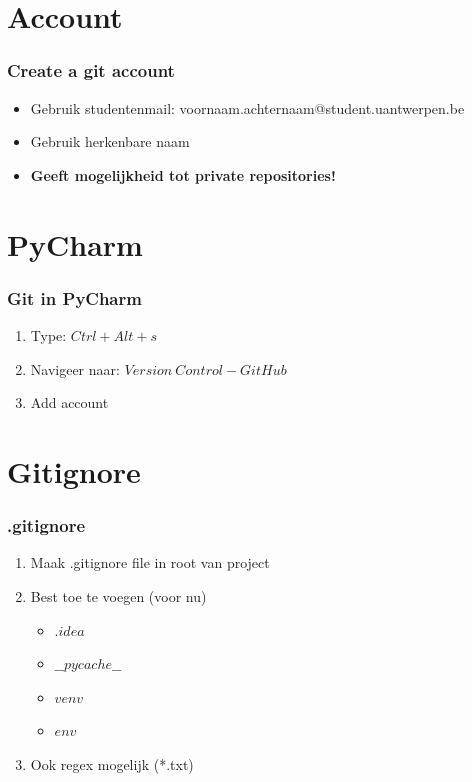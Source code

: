 	
	
	\section{Account}
    \begin{frame} 
		\frametitle{Create a git account}
		\begin{itemize}
			\item Gebruik studentenmail: voornaam.achternaam@student.uantwerpen.be
			\item Gebruik herkenbare naam
		\end{itemize}

		\begin{itemize}
			\item \textbf{Geeft mogelijkheid tot private repositories!}
		\end{itemize}
		
	\end{frame}
	
	\section{PyCharm}
    \begin{frame} 
		\frametitle{Git in PyCharm}
		 \begin{enumerate}
		 	\item Type: $Ctrl+Alt+s$
		 	\item Navigeer naar: $Version\: Control - GitHub$
		 	\item Add account
		 \end{enumerate}
	\end{frame}
	
	\section{Gitignore}
    \begin{frame}
		\frametitle{.gitignore}
        \begin{enumerate}
        	\item Maak .gitignore file in root van project
        	\item Best toe te voegen (voor nu)
        	\begin{itemize}
        		\item $.idea$
        		\item $\_\_pycache\_\_$
        		\item $venv$
        		\item $env$
        	\end{itemize}
        	\item Ook regex mogelijk (*.txt)
        \end{enumerate}
	\end{frame}
		
